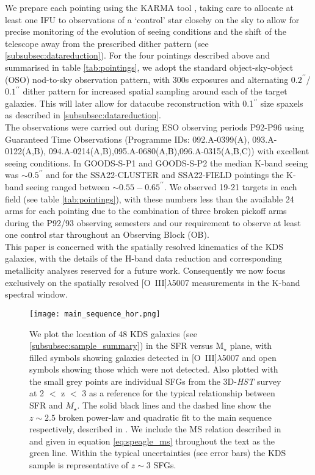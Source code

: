 \documentclass[fleqn,usenatbib]{mn2e}
\begin{document}
We prepare each pointing using the KARMA tool \citep{Wegner2008}, taking care to allocate at least one IFU to observations of a `control' star closeby on the sky to allow for precise monitoring of the evolution of seeing conditions and the shift of the telescope away from the prescribed dither pattern (see \cref{subsubsec:datareduction}).
For the four pointings described above and summarised in table \ref{tab:pointings}, we adopt the standard object-sky-object (OSO) nod-to-sky observation pattern, with 300s exposures and alternating $0.2^{\prime\prime}$/$0.1^{\prime\prime}$ dither pattern for increased spatial sampling around each of the target galaxies.
This will later allow for datacube reconstruction with 0.1$^{\prime\prime}$ size spaxels as described in \cref{subsubsec:datareduction}. \\

The observations were carried out during ESO observing periods P92-P96 using Guaranteed Time Observations (Programme IDs: 092.A-0399(A), 093.A-0122(A,B), 094.A-0214(A,B),095.A-0680(A,B),096.A-0315(A,B,C)) with excellent seeing conditions.
In GOODS-S-P1 and GOODS-S-P2 the median K-band seeing was $\sim 0.5^{\prime\prime}$ and for the SSA22-CLUSTER and SSA22-FIELD pointings the K-band seeing ranged between $\sim 0.55-0.65^{\prime\prime}$.
We observed 19-21 targets in each field (see table \ref{tab:pointings}), with these numbers less than the available 24 arms for each pointing due to the combination of three broken pickoff arms during the P92/93 observing semesters and our requirement to observe at least one control star throughout an Observing Block (OB). \\

This paper is concerned with the spatially resolved kinematics of the KDS galaxies, with the details of the H-band data reduction and corresponding metallicity analyses reserved for a future work.
Consequently we now focus exclusively on the spatially resolved [O~{\sc III}]$\lambda$5007 measurements in the K-band spectral window. 

\begin{figure*}
\centering
\texttt{[image: main\_sequence\_hor.png]}
\caption{We plot the location of 48 KDS galaxies (see \cref{subsubsec:sample_summary}) in the SFR versus M$_{\star}$ plane, with filled symbols showing galaxies detected in [O~{\sc III}]$\lambda$5007 and open symbols showing those which were not detected. 
Also plotted with the small grey points are individual SFGs from the 3D-{\em HST} survey  \protect\citep{Brammer2012,Momcheva2016} at 2 $<$ z $<$ 3 as a reference for the typical relationship between SFR and $M_{\star}$.
The solid black lines and the dashed line show the $z\sim2.5$ broken power-law and quadratic fit to the main sequence respectively, described in \protect\cite{Whitaker2014}.
We include the MS relation described in \protect\cite{Speagle2014} and given in equation \protect\ref{eq:speagle_ms} throughout the text as the green line. 
Within the typical uncertainties (see error bars) the KDS sample is representative of $z\sim3$ SFGs.}
\label{fig:main_sequence}
\end{figure*}
\end{document}
